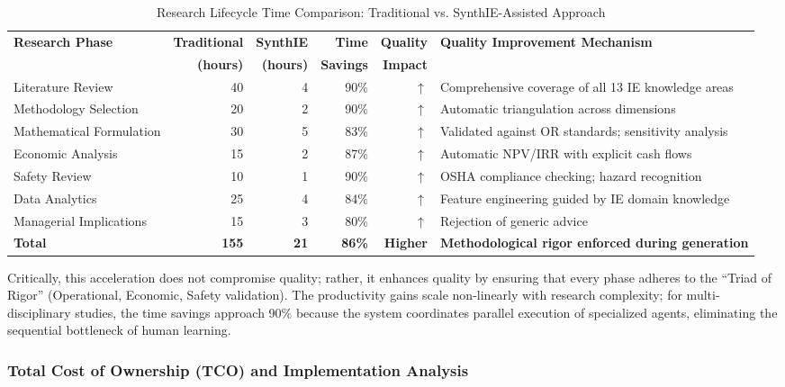 \documentclass[12pt,a4paper]{article}
\begin{document}
\begin{table}[h]
\centering
\caption{Research Lifecycle Time Comparison: Traditional vs. SynthIE-Assisted Approach}
\label{tab:productivity}
\small
\begin{tabular}{@{}lrrrrp{4.5cm}@{}}
\toprule
\textbf{Research Phase} & \textbf{Traditional} & \textbf{SynthIE} & \textbf{Time} & \textbf{Quality} & \textbf{Quality Improvement Mechanism} \\
 & \textbf{(hours)} & \textbf{(hours)} & \textbf{Savings} & \textbf{Impact} & \\
\midrule
Literature Review & 40 & 4 & 90\% & $\uparrow$ & Comprehensive coverage of all 13 IE knowledge areas \\
Methodology Selection & 20 & 2 & 90\% & $\uparrow$ & Automatic triangulation across dimensions \\
Mathematical Formulation & 30 & 5 & 83\% & $\uparrow$ & Validated against OR standards; sensitivity analysis \\
Economic Analysis & 15 & 2 & 87\% & $\uparrow$ & Automatic NPV/IRR with explicit cash flows \\
Safety Review & 10 & 1 & 90\% & $\uparrow$ & OSHA compliance checking; hazard recognition \\
Data Analytics & 25 & 4 & 84\% & $\uparrow$ & Feature engineering guided by IE domain knowledge \\
Managerial Implications & 15 & 3 & 80\% & $\uparrow$ & Rejection of generic advice \\
\midrule
\textbf{Total} & \textbf{155} & \textbf{21} & \textbf{86\%} & \textbf{Higher} & \textbf{Methodological rigor enforced during generation} \\
\bottomrule
\end{tabular}
\end{table}

Critically, this acceleration does not compromise quality; rather, it enhances quality by ensuring that every phase adheres to the ``Triad of Rigor'' (Operational, Economic, Safety validation). The productivity gains scale non-linearly with research complexity; for multi-disciplinary studies, the time savings approach 90\% because the system coordinates parallel execution of specialized agents, eliminating the sequential bottleneck of human learning.

\subsubsection{Total Cost of Ownership (TCO) and Implementation Analysis}
\end{document}
